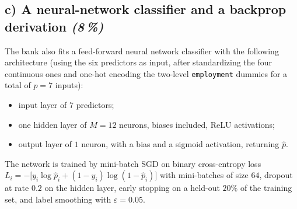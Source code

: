 \documentclass[11pt,a4paper]{article}
\newcommand{\subpoints}[1]{\textit{(#1\,\%)}}
\begin{document}
\subsection*{c) A neural-network classifier and a backprop derivation \subpoints{8}}

The bank also fits a feed-forward neural network classifier with the following architecture (using the six predictors as input, after standardizing the four continuous ones and one-hot encoding the two-level \texttt{employment} dummies for a total of $p = 7$ inputs):

\begin{itemize}
  \item input layer of $7$ predictors;
  \item one hidden layer of $M = 12$ neurons, biases included, ReLU activations;
  \item output layer of $1$ neuron, with a bias and a sigmoid activation, returning $\hat p$.
\end{itemize}

The network is trained by mini-batch SGD on binary cross-entropy loss $L_i = -\bigl[y_i \log \hat p_i + (1 - y_i) \log(1 - \hat p_i)\bigr]$ with mini-batches of size $64$, dropout at rate $0.2$ on the hidden layer, early stopping on a held-out $20\%$ of the training set, and label smoothing with $\varepsilon = 0.05$.
\end{document}
